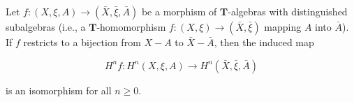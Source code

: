 Let $f: (X, \xi, A) \rightarrow (\bar{X}, \bar{\xi}, \bar{A})$ be a morphism of $\mathbf{T}$-algebras with distinguished subalgebras (i.e., a $\mathbf{T}$-homomorphism $f: (X, \xi) \rightarrow (\bar{X}, \bar{\xi})$ mapping $A$ into $\bar{A}$). If $f$ restricts to a bijection from $X - A$ to $\bar{X} - \bar{A}$, then the induced map

$$H^n f: H^n(X, \xi, A) \rightarrow H^n(\bar{X}, \bar{\xi}, \bar{A})$$

is an isomorphism for all $n \geq 0$.
